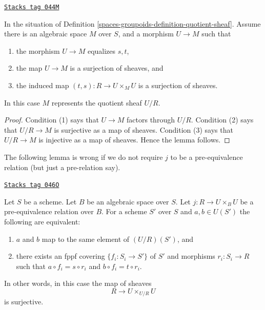 \begin{lemma}
\label{spaces-groupoids-lemma-criterion-quotient-representable}
\href{https://stacks.math.columbia.edu/tag/044M}{\texttt{Stacks tag 044M}}

In the situation of Definition \ref{spaces-groupoids-definition-quotient-sheaf}.
Assume there is an algebraic space $M$ over $S$,
and a morphism $U \to M$ such that
\begin{enumerate}
\item the morphism $U \to M$ equalizes $s, t$,
\item the map $U \to M$ is a surjection of sheaves, and
\item the induced map $(t, s) : R \to U \times_M U$ is a
surjection of sheaves.
\end{enumerate}
In this case $M$ represents the quotient sheaf $U/R$.
\end{lemma}

\begin{proof}
Condition (1) says that $U \to M$ factors through $U/R$.
Condition (2) says that $U/R \to M$ is surjective as a map of sheaves.
Condition (3) says that $U/R \to M$ is injective as a map of sheaves.
Hence the lemma follows.
\end{proof}

The following lemma is wrong if we do not require $j$ to be a
pre-equivalence relation (but just a pre-relation say).

\begin{lemma}
\label{spaces-groupoids-lemma-quotient-pre-equivalence}
\href{https://stacks.math.columbia.edu/tag/046O}{\texttt{Stacks tag 046O}}

Let $S$ be a scheme. Let $B$ be an algebraic space over $S$.
Let $j : R \to U \times_B U$ be a pre-equivalence relation over $B$.
For a scheme $S'$ over $S$ and $a, b \in U(S')$ the following are equivalent:
\begin{enumerate}
\item $a$ and $b$ map to the same element of $(U/R)(S')$, and
\item there exists an fppf covering $\{f_i : S_i \to S'\}$ of $S'$
and morphisms $r_i : S_i \to R$ such that
$a \circ f_i = s \circ r_i$ and $b \circ f_i = t \circ r_i$.
\end{enumerate}
In other words, in this case the map of sheaves
$$
R \longrightarrow U \times_{U/R} U
$$
is surjective.
\end{lemma}

